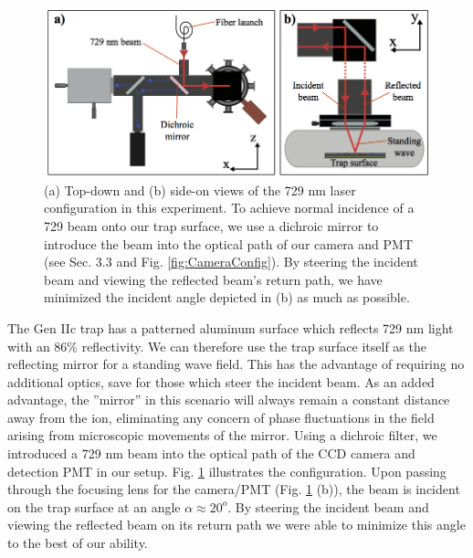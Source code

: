 \begin{figure}[t]
    \begin{center}
        \includegraphics{figures/4/Fig_SWlaserConfigPNG}
        \caption{\label{fig:SWlaserConfig} (a) Top-down and (b) side-on views of the 729 nm laser configuration in this experiment. To achieve normal incidence of a 729 beam onto our trap surface, we use a dichroic mirror to introduce the beam into the optical path of our camera and PMT (see Sec. 3.3 and Fig. \ref{fig:CameraConfig}). By steering the incident beam and viewing the reflected beam's return path, we have minimized the incident angle depicted in (b) as much as possible.    }
    \end{center}
\end{figure}


The Gen IIc trap has a patterned aluminum surface which reflects 729 nm light with an 86\% reflectivity. We can therefore use the trap surface itself as the reflecting mirror for a standing wave field. This has the advantage of requiring no additional optics, save for those which steer the incident beam. As an added advantage, the ''mirror'' in this scenario will always remain a constant distance away from the ion, eliminating any concern of phase fluctuations in the field arising from microscopic movements of the mirror. Using a dichroic filter, we introduced a 729 nm beam into the optical path of the CCD camera and detection PMT in our setup. Fig. \ref{fig:SWlaserConfig} illustrates the configuration. Upon passing through the focusing lens for the camera/PMT (Fig. \ref{fig:SWlaserConfig} (b)), the beam is incident on the trap surface at an angle $\alpha \approx 20^o$. By steering the incident beam and viewing the reflected beam on its return path we were able to minimize this angle to the best of our ability. 

